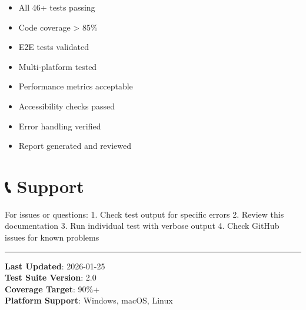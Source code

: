 \documentclass[
  11pt,
  oneside,
  openany]{scrbook}
\providecommand{\tightlist}{%
  \setlength{\itemsep}{0pt}\setlength{\parskip}{0pt}}\usepackage{longtable,booktabs,array}
\begin{document}
\begin{itemize}
\tightlist
\item[$\square$]
  All 46+ tests passing
\item[$\square$]
  Code coverage \textgreater{} 85\%
\item[$\square$]
  E2E tests validated
\item[$\square$]
  Multi-platform tested
\item[$\square$]
  Performance metrics acceptable
\item[$\square$]
  Accessibility checks passed
\item[$\square$]
  Error handling verified
\item[$\square$]
  Report generated and reviewed
\end{itemize}

\section{📞 Support}\label{support}

For issues or questions: 1. Check test output for specific errors 2.
Review this documentation 3. Run individual test with verbose output 4.
Check GitHub issues for known problems

\begin{center}\rule{0.5\linewidth}{0.5pt}\end{center}

\textbf{Last Updated}: 2026-01-25\\
\textbf{Test Suite Version}: 2.0\\
\textbf{Coverage Target}: 90\%+\\
\textbf{Platform Support}: Windows, macOS, Linux


\backmatter
\end{document}
